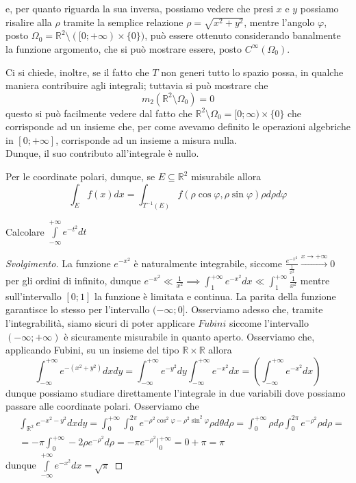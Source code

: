 e, per quanto riguarda la sua inversa, possiamo vedere che presi $x$ e $y$ possiamo risalire alla $\rho$ tramite la semplice relazione $\rho = \sqrt{x^2 + y^2}$, mentre 
l'angolo $\varphi$, posto $\Omega_0 = \mathbb{R}^2 \setminus ([0; +\infty) \times \{0\})$, può essere ottenuto considerando banalmente la funzione argomento, che si può mostrare essere, posto  $C^{\infty}(\Omega_0)$. \\
\begin{remark}
Ci si chiede, inoltre, se il fatto che $T$ non generi tutto lo spazio possa, in qualche maniera contribuire agli integrali; tuttavia si può mostrare che
$$
m_2(\mathbb{R}^2 \setminus \Omega_0) = 0
$$
questo si può facilmente vedere dal fatto che $\mathbb{R}^2 \setminus \Omega_0 = [0; \infty) \times \{0\}$ che corrisponde ad un insieme che, per come avevamo definito le operazioni algebriche in $[0; +\infty]$, corrisponde ad un insieme a misura nulla. \\
Dunque, il suo contributo all'integrale è nullo.
\end{remark}
Per le coordinate polari, dunque, se $E \subseteq \mathbb{R}^2$ misurabile allora
\begin{equation}
	\int_E f(x)dx = \int_{T^{-1}(E)} f(\rho \cos{\varphi}, \rho \sin{\varphi}) \rho d\rho d\varphi
\end{equation}
\begin{exercise}
	Calcolare $\int\limits_{-\infty}^{+\infty} e^{-t^2} dt$
\end{exercise}
\begin{proof}[Svolgimento]
	La funzione $e^{-x^2}$ è naturalmente integrabile, siccome $\frac{e^{-x^2}}{\frac{1}{x^2}} \stackrel{x \to +\infty}{\to} 0$ per gli ordini di infinito, dunque $e^{-x^2} \ll \frac{1}{x^2} \implies \int_1^{+\infty} e^{-x^2} dx \ll \int_1^{+\infty} \frac{1}{x^2}$ mentre sull'intervallo $[0; 1]$ la funzione è limitata e continua. La parita della funzione garantisce lo stesso per l'intervallo $(-\infty; 0]$. Osserviamo
	adesso che, tramite l'integrabilità, siamo sicuri di poter applicare $Fubini$ siccome l'intervallo $(-\infty; +\infty)$ è sicuramente misurabile in quanto aperto. Osserviamo che, applicando Fubini, su un insieme del tipo $\mathbb{R} \times \mathbb{R}$ allora
	$$
	\int_{-\infty}^{+\infty} e^{-(x^2 + y^2)}dxdy = \int_{-\infty}^{+\infty} e^{-y^2} dy \int_{-\infty}^{+\infty} e^{-x^2} dx = (\int_{-\infty}^{+\infty} e^{-x^2}dx)
	$$
	dunque possiamo studiare direttamente l'integrale in due variabili dove possiamo passare alle coordinate polari. Osserviamo che
	\begin{align*}
	&\int_{\mathbb{R}^2} e^{-x^2 - y^2} dxdy = \int_{0}^{+\infty} \int_{0}^{2\pi} e^{-\rho^2 \cos^2{\varphi} - \rho^2 \sin^2{\varphi}} \rho d\theta d\rho = \int_0^{+\infty} \rho d\rho \int_{0}^{2 \pi} e^{-\rho^2} \rho d\rho = \\
	&=-\pi \int_0^{+\infty} -2 \rho e^{-\rho^2} d\rho = - \pi e^{-\rho^2}\Bigg|^{+\infty}_{0} =0 + \pi = \pi
	\end{align*}
	dunque $\int\limits_{-\infty}^{+\infty} e^{-x^2} dx = \sqrt{\pi}$ 
\end{proof}
